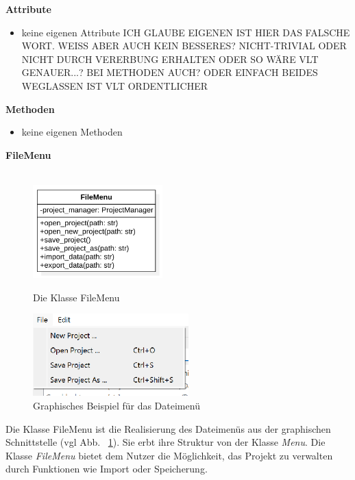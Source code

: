 \documentclass{article}
\begin{document}
\textbf{{Attribute}}
\begin{itemize}
\item[] keine eigenen Attribute \newline ICH GLAUBE EIGENEN IST HIER DAS FALSCHE WORT. WEISS ABER AUCH KEIN BESSERES? NICHT-TRIVIAL ODER NICHT DURCH VERERBUNG ERHALTEN ODER SO WÄRE VLT GENAUER...? BEI METHODEN AUCH? ODER EINFACH BEIDES WEGLASSEN IST VLT ORDENTLICHER
\end{itemize}
    
\textbf{{Methoden}}
\begin{itemize}
\item[] keine eigenen Methoden
\end{itemize}

\newpage
\textbf{\large{FileMenu}}\\\\
\begin{figure}[H]%
    \centering
    \begin{minipage}[b]{0.4\textwidth}
        \includegraphics[width=5cm]{entwurf/Entwurf_dokument/img/klassenView/FileMenu.png}
        \caption{Die Klasse FileMenu}
    \end{minipage}
    \hfill
    \begin{minipage}[b]{0.4\textwidth}
        \includegraphics[width=6cm]{entwurf/Entwurf_dokument/img/Alissa/EditMenuGUI.png} %
    \caption{Graphisches Beispiel für das Dateimenü}
    \label{fig:FileMenuGUI}
    \end{minipage}
\end{figure}
Die Klasse FileMenu ist die Realisierung des Dateimenüs aus der graphischen Schnittstelle (vgl Abb. ~\ref{fig:FileMenuGUI}). Sie erbt ihre Struktur von der Klasse \textit{Menu}. Die Klasse \textit{FileMenu} bietet dem Nutzer die Möglichkeit, das Projekt zu verwalten durch Funktionen wie Import oder Speicherung.
\newline \newline
\end{document}
